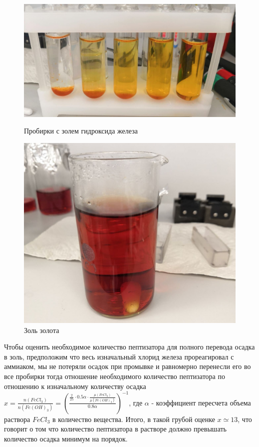 \documentclass[a4paper, 12pt]{article}
\begin{document}
\begin{figure}[h]
\begin{center}
\begin{minipage}[h]{0.45\linewidth}
\includegraphics[width=1\textwidth]{photo_2021-03-11_19-04-43.jpg}
\caption{Пробирки с золем гидроксида железа} %
\label{ris:experimoriginal} %
\end{minipage}
\hfill 
\begin{minipage}[h]{0.45\linewidth}
\includegraphics[width=1\textwidth]{photo_2021-03-11_20-30-16.jpg}
\caption{Золь золота}
\label{ris:experimcoded}
\end{minipage}
\end{center}
\end{figure}

Чтобы оценить необходимое количество пептизатора для полного перевода осадка в золь, предположим что весь изначальный хлорид железа прореагировал с аммиаком, мы не потеряли осадок при промывке и равномерно перенесли его во все пробирки тогда отношение необходимого количество пептизатора по отношению к изначальному количеству осадка $x=\frac{n(FeCl_{3})}{n(Fe(OH)_{3})} = (\frac{\frac{2}{25} \cdot 0.5\alpha \cdot \frac{\mu(FeCl_{3})}{\mu(Fe(OH)_{3})}}{0.8\alpha})^{-1}$, где $\alpha$ - коэффициент пересчета объема раствора $FeCl_{3}$ в количество вещества. Итого, в такой грубой оценке $x \simeq 13 $, что говорит о том что количество пептизатора в растворе должно превышать количество осадка минимум на порядок.
\end{document}
